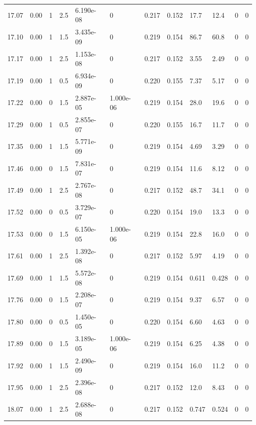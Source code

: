 \documentclass[preview]{standalone}
\begin{document}
{{{{{{{{\begin{tabular}{L{1.2cm}C{1.2cm} C{0.3cm}C{0.5cm} C{1.4cm}C{1.4cm} C{1.4cm}C{1.4cm} C{1.6cm}C{1.6cm} C{1.6cm}C{1.6cm}}
  17.07  &  0.00  & 1     & 2.5 &  6.190e-08  & 0  &  0.217&   0.152& 17.7 & 12.4   &  0 & 0  \\ 
  17.10  &  0.00  & 1     & 1.5 &  3.435e-09  & 0  &  0.219&   0.154& 86.7 & 60.8   &  0 & 0  \\ 
  17.17  &  0.00  & 1     & 2.5 &  1.153e-08  & 0  &  0.217&   0.152& 3.55 & 2.49   &  0 & 0  \\ 
  17.19  &  0.00  & 1     & 0.5 &  6.934e-09  & 0  &  0.220&   0.155& 7.37 & 5.17   &  0 & 0  \\ 
  17.22  &  0.00  & 0     & 1.5 &  2.887e-05  & 1.000e-06  &  0.219&   0.154& 28.0 & 19.6   &  0 & 0  \\ 
  17.29  &  0.00  & 1     & 0.5 &  2.855e-07  & 0  &  0.220&   0.155& 16.7 & 11.7   &  0 & 0  \\ 
  17.35  &  0.00  & 1     & 1.5 &  5.771e-09  & 0  &  0.219&   0.154& 4.69 & 3.29   &  0 & 0  \\ 
  17.46  &  0.00  & 0     & 1.5 &  7.831e-07  & 0  &  0.219&   0.154& 11.6 & 8.12   &  0 & 0  \\ 
  17.49  &  0.00  & 1     & 2.5 &  2.767e-08  & 0  &  0.217&   0.152& 48.7 & 34.1   &  0 & 0  \\ 
  17.52  &  0.00  & 0     & 0.5 &  3.729e-07  & 0  &  0.220&   0.154& 19.0 & 13.3   &  0 & 0  \\ 
  17.53  &  0.00  & 0     & 1.5 &  6.150e-05  & 1.000e-06  &  0.219&   0.154& 22.8 & 16.0   &  0 & 0  \\ 
  17.61  &  0.00  & 1     & 2.5 &  1.392e-08  & 0  &  0.217&   0.152& 5.97 & 4.19   &  0 & 0  \\ 
  17.69  &  0.00  & 1     & 1.5 &  5.572e-08  & 0  &  0.219&   0.154& 0.611 & 0.428   &  0 & 0  \\ 
  17.76  &  0.00  & 0     & 1.5 &  2.208e-07  & 0  &  0.219&   0.154& 9.37 & 6.57   &  0 & 0  \\ 
  17.80  &  0.00  & 0     & 0.5 &  1.450e-05  & 0  &  0.220&   0.154& 6.60 & 4.63   &  0 & 0  \\ 
  17.89  &  0.00  & 0     & 1.5 &  3.189e-05  & 1.000e-06  &  0.219&   0.154& 6.25 & 4.38   &  0 & 0  \\ 
  17.92  &  0.00  & 1     & 1.5 &  2.490e-09  & 0  &  0.219&   0.154& 16.0 & 11.2   &  0 & 0  \\ 
  17.95  &  0.00  & 1     & 2.5 &  2.396e-08  & 0  &  0.217&   0.152& 12.0 & 8.43   &  0 & 0  \\ 
  18.07  &  0.00  & 1     & 2.5 &  2.688e-08  & 0  &  0.217&   0.152& 0.747 & 0.524   &  0 & 0  \\ 

\end{tabular}}}}}}}}}
\end{document}
